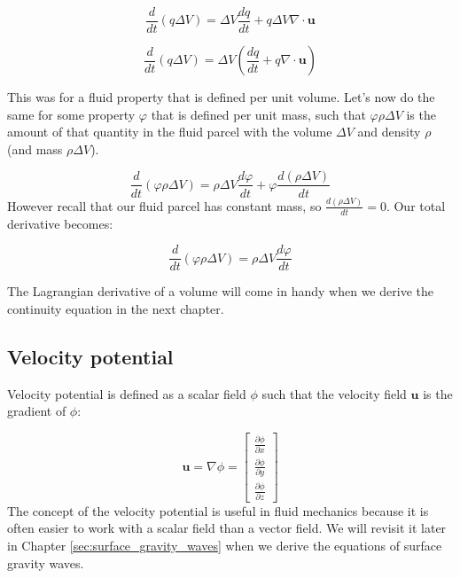 \documentclass[12pt]{article}
\numberwithin{equation}{section}
\numberwithin{figure}{section}
\numberwithin{table}{section}
\begin{document}
\begin{equation}
  \frac{d}{dt} (q \Delta V) = \Delta V \frac{dq}{dt} + q \Delta V \nabla \cdot \mathbf{u}
\end{equation}

\begin{equation}
  \frac{d}{dt} (q \Delta V) = \Delta V \left( \frac{dq}{dt} + q \nabla \cdot \mathbf{u} \right)
  \label{eq:lagrangian_property_derivative}
\end{equation}

This was for a fluid property that is defined per unit volume.
Let's now do the same for some property $\varphi$ that is defined per unit mass,
such that $\varphi \rho \Delta V$ is the amount of that quantity in the fluid
parcel with the volume $\Delta V$ and density $\rho$ (and mass $\rho \Delta V$).

\begin{equation}
  \frac{d}{dt} (\varphi \rho \Delta V) = \rho \Delta V \frac{d\varphi}{dt} + \varphi \frac{d(\rho \Delta V)}{dt}
  \label{eq:lagrangian_property_per_mass_derivative}
\end{equation}
However recall that our fluid parcel has constant mass, so $\frac{d(\rho \Delta V)}{dt} = 0$.
Our total derivative becomes:

\begin{equation}
  \frac{d}{dt} (\varphi \rho \Delta V) = \rho \Delta V \frac{d\varphi}{dt}
\end{equation}

The Lagrangian derivative of a volume will come in handy when we derive the
continuity equation in the next chapter.

\subsection{Velocity potential}

Velocity potential is defined as a scalar field $\phi$ such that the velocity
field $\mathbf{u}$ is the gradient of $\phi$:

\begin{equation}
  \mathbf{u} = \nabla \phi =
  \begin{bmatrix}
    \frac{\partial \phi}{\partial x} \\
    \frac{\partial \phi}{\partial y} \\
    \frac{\partial \phi}{\partial z}
  \end{bmatrix}
\end{equation}
The concept of the velocity potential is useful in fluid mechanics because it is
often easier to work with a scalar field than a vector field.
We will revisit it later in Chapter \ref{sec:surface_gravity_waves} when we
derive the equations of surface gravity waves.
\end{document}
